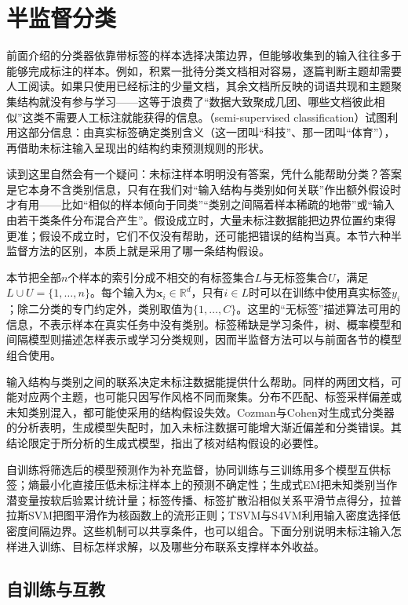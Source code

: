 \section{半监督分类}
\label{sec:classification-semisupervised}

前面介绍的分类器依靠带标签的样本选择决策边界，但能够收集到的输入往往多于能够完成标注的样本。例如，积累一批待分类文档相对容易，逐篇判断主题却需要人工阅读。如果只使用已经标注的少量文档，其余文档所反映的词语共现和主题聚集结构就没有参与学习——这等于浪费了“数据大致聚成几团、哪些文档彼此相似”这类不需要人工标注就能获得的信息。（semi-supervised classification）试图利用这部分信息：由真实标签确定类别含义（这一团叫“科技”、那一团叫“体育”），再借助未标注输入呈现出的结构约束预测规则的形状。

读到这里自然会有一个疑问：未标注样本明明没有答案，凭什么能帮助分类？答案是它本身不含类别信息，只有在我们对“输入结构与类别如何关联”作出额外假设时才有用——比如“相似的样本倾向于同类”“类别之间隔着样本稀疏的地带”或“输入由若干类条件分布混合产生”。假设成立时，大量未标注数据能把边界位置约束得更准；假设不成立时，它们不仅没有帮助，还可能把错误的结构当真。本节六种半监督方法的区别，本质上就是采用了哪一条结构假设。

本节把全部$n$个样本的索引分成不相交的有标签集合$L$与无标签集合$U$，满足$L\cup U=\{1,\dots,n\}$。每个输入为$\bm{x}_i\in\mathbb{R}^{d}$，只有$i\in L$时可以在训练中使用真实标签$y_i$；除二分类的专门约定外，类别取值为$\{1,\dots,C\}$。这里的“无标签”描述算法可用的信息，不表示样本在真实任务中没有类别。标签稀缺是学习条件，树、概率模型和间隔模型则描述怎样表示或学习分类规则，因而半监督方法可以与前面各节的模型组合使用。

输入结构与类别之间的联系决定未标注数据能提供什么帮助。同样的两团文档，可能对应两个主题，也可能只因写作风格不同而聚集。分布不匹配、标签采样偏差或未知类别混入，都可能使采用的结构假设失效。Cozman与Cohen对生成式分类器的分析表明，生成模型失配时，加入未标注数据可能增大渐近偏差和分类错误。其结论限定于所分析的生成式模型，指出了核对结构假设的必要性。

自训练将筛选后的模型预测作为补充监督，协同训练与三训练用多个模型互供标签；熵最小化直接压低未标注样本上的预测不确定性；生成式EM把未知类别当作潜变量按软后验累计统计量；标签传播、标签扩散沿相似关系平滑节点得分，拉普拉斯SVM把图平滑作为核函数上的流形正则；TSVM与S4VM利用输入密度选择低密度间隔边界。这些机制可以共享条件，也可以组合。下面分别说明未标注输入怎样进入训练、目标怎样求解，以及哪些分布联系支撑样本外收益。

\subsection{自训练与互教}
\label{sec:classification-self-training}

